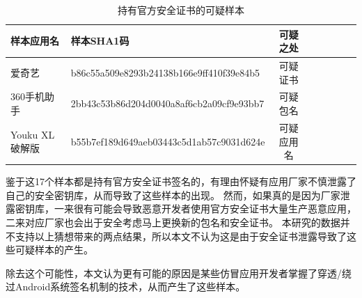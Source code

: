 \begin{table}[htbp]
    \renewcommand{\arraystretch}{1}
    \small
    \centering
    \caption{持有官方安全证书的可疑样本}
    \begin{tabular}{l l c c c c c c}
        \toprule
        {\bf 样本应用名} & {\bf 样本SHA1码} & {\bf 可疑之处} \\
        \midrule
        爱奇艺 & b86c55a509e8293b24138b166e9ff410f39e84b5 & 可疑证书\\
        \rowcolor{gray!15} 360手机助手 & 2bb43c53b86d204d0040a8af6cb2a09cf9e93bb7 & 可疑包名\\
        Youku XL 破解版 & b55b7ef189d649aeb03443c5d1ab57c9031d624e & 可疑应用名 \\
        \bottomrule
    \end{tabular}
    \label{table:suspicious_samples}
\end{table}

鉴于这17个样本都是持有官方安全证书签名的，有理由怀疑有应用厂家不慎泄露了自己的安全密钥库，从而导致了这些样本的出现。
然而，如果真的是因为厂家泄露密钥库，一来很有可能会导致恶意开发者使用官方安全证书大量生产恶意应用，二来对应厂家也会出于安全考虑马上更换新的包名和安全证书。
本研究的数据并不支持以上猜想带来的两点结果，所以本文不认为这是由于安全证书泄露导致了这些可疑样本的产生。

除去这个可能性，本文认为更有可能的原因是某些仿冒应用开发者掌握了穿透/绕过Android系统签名机制的技术，从而产生了这些样本。

